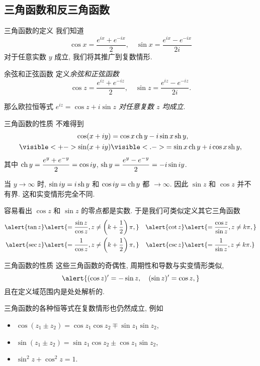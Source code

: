 \subsection{三角函数和反三角函数}
\begin{frame}{三角函数的定义}
\onslide<+->
我们知道
\[\cos x=\frac{e^{ix}+e^{-ix}}2,\quad
\sin x=\frac{e^{ix}-e^{-ix}}{2i}\]
对于任意实数 $y$ 成立,
\onslide<+->
我们将其推广到复数情形.
\onslide<+->

\begin{alertblock}{余弦和正弦函数}
定义\emph{余弦和正弦函数}
\[\displaystyle\cos z=\frac{e^{iz}+e^{-iz}}2,\quad
\sin z=\frac{e^{iz}-e^{-iz}}{2i}.\]
\end{alertblock}

\onslide<+->
那么欧拉恒等式 \emph{$e^{iz}=\cos z+i\sin z$ 对任意复数 $z$ 均成立}.
\end{frame}


\begin{frame}{三角函数的性质}
\onslide<+->
不难得到
\begin{align*}
\cos(x+iy)&
=\cos x \ch y-i\sin x\sh y,\\
\visible<+->{\sin(x+iy)}&
\visible<.->{=\sin x\ch y+i\cos x\sh y,}
\end{align*}
\onslide<+->
其中 $\operatorname{ch} y=\dfrac{e^y+e^{-y}}2=\cos{iy}$, $\operatorname{sh} y=\dfrac{e^y-e^{-y}}2=-i\sin{iy}$.

\onslide<+->
当 $y\to\infty$ 时, $\sin iy=i\operatorname{sh} y$ 和 $\cos iy=\operatorname{ch} y$ 都 $\to\infty$.
\onslide<+->
因此 \alert{$\sin z$ 和 $\cos z$ 并不有界}. 
\onslide<+->
这和实变情形完全不同.

\onslide<+->
容易看出 $\cos z$ 和 $\sin z$ 的零点都是实数.
\onslide<+->
于是我们可类似定义其它三角函数
\begin{align*}
\alert{\tan z}&
\alert{=\frac{\sin z}{\cos z},z\neq\left(k+\half\right)\pi,}&
\alert{\cot z}&
\alert{=\frac{\cos z}{\sin z},z\neq k\pi,}\\
\alert{\sec z}&
\alert{=\frac{1}{\cos z},z\neq\left(k+\half\right)\pi,}&
\alert{\csc z}&
\alert{=\frac{1}{\sin z},z\neq k\pi.}
\end{align*}
\end{frame}


\begin{frame}{三角函数的性质}
\onslide<+->
这些三角函数的奇偶性, 周期性和导数与实变情形类似,
\[\alert{(\cos z)'=-\sin z,\quad
(\sin z)'=\cos z,}\]
\onslide<+->
且在定义域范围内是处处解析的.

\onslide<+->
三角函数的各种恒等式在复数情形也仍然成立,
\onslide<+->
例如
\begin{itemize}
\item $\cos(z_1\pm z_2)=\cos z_1 \cos z_2\mp \sin z_1 \sin z_2$,
\item $\sin(z_1\pm z_2)=\sin z_1 \cos z_2\pm\cos z_1 \sin z_2$,
\item $\sin^2z+\cos^2z=1$.
\end{itemize}
\end{frame}


